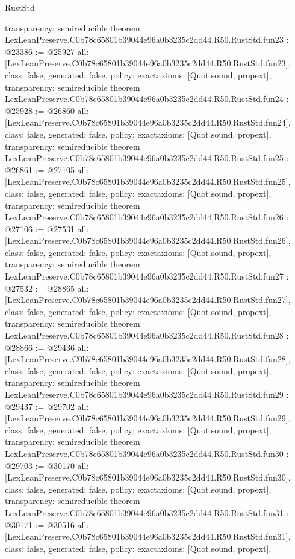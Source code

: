\begin{lexlean}{RustStd}
\begin{coremodule}
{  transparency: semireducible
}
theorem LexLeanPreserve.C0b78c65801b39044e96a0b3235c2dd44.R50.RustStd.fun23 : @23386 := @25927 {
  all: [LexLeanPreserve.C0b78c65801b39044e96a0b3235c2dd44.R50.RustStd.fun23],
  class: false,
  generated: false,
  policy: exact{axioms: [Quot.sound, propext]},
  transparency: semireducible
}
theorem LexLeanPreserve.C0b78c65801b39044e96a0b3235c2dd44.R50.RustStd.fun24 : @25928 := @26860 {
  all: [LexLeanPreserve.C0b78c65801b39044e96a0b3235c2dd44.R50.RustStd.fun24],
  class: false,
  generated: false,
  policy: exact{axioms: [Quot.sound, propext]},
  transparency: semireducible
}
theorem LexLeanPreserve.C0b78c65801b39044e96a0b3235c2dd44.R50.RustStd.fun25 : @26861 := @27105 {
  all: [LexLeanPreserve.C0b78c65801b39044e96a0b3235c2dd44.R50.RustStd.fun25],
  class: false,
  generated: false,
  policy: exact{axioms: [Quot.sound, propext]},
  transparency: semireducible
}
theorem LexLeanPreserve.C0b78c65801b39044e96a0b3235c2dd44.R50.RustStd.fun26 : @27106 := @27531 {
  all: [LexLeanPreserve.C0b78c65801b39044e96a0b3235c2dd44.R50.RustStd.fun26],
  class: false,
  generated: false,
  policy: exact{axioms: [Quot.sound, propext]},
  transparency: semireducible
}
theorem LexLeanPreserve.C0b78c65801b39044e96a0b3235c2dd44.R50.RustStd.fun27 : @27532 := @28865 {
  all: [LexLeanPreserve.C0b78c65801b39044e96a0b3235c2dd44.R50.RustStd.fun27],
  class: false,
  generated: false,
  policy: exact{axioms: [Quot.sound, propext]},
  transparency: semireducible
}
theorem LexLeanPreserve.C0b78c65801b39044e96a0b3235c2dd44.R50.RustStd.fun28 : @28866 := @29436 {
  all: [LexLeanPreserve.C0b78c65801b39044e96a0b3235c2dd44.R50.RustStd.fun28],
  class: false,
  generated: false,
  policy: exact{axioms: [Quot.sound, propext]},
  transparency: semireducible
}
theorem LexLeanPreserve.C0b78c65801b39044e96a0b3235c2dd44.R50.RustStd.fun29 : @29437 := @29702 {
  all: [LexLeanPreserve.C0b78c65801b39044e96a0b3235c2dd44.R50.RustStd.fun29],
  class: false,
  generated: false,
  policy: exact{axioms: [Quot.sound, propext]},
  transparency: semireducible
}
theorem LexLeanPreserve.C0b78c65801b39044e96a0b3235c2dd44.R50.RustStd.fun30 : @29703 := @30170 {
  all: [LexLeanPreserve.C0b78c65801b39044e96a0b3235c2dd44.R50.RustStd.fun30],
  class: false,
  generated: false,
  policy: exact{axioms: [Quot.sound, propext]},
  transparency: semireducible
}
theorem LexLeanPreserve.C0b78c65801b39044e96a0b3235c2dd44.R50.RustStd.fun31 : @30171 := @30516 {
  all: [LexLeanPreserve.C0b78c65801b39044e96a0b3235c2dd44.R50.RustStd.fun31],
  class: false,
  generated: false,
  policy: exact{axioms: [Quot.sound, propext]},
}
\end{coremodule}
\end{lexlean}

